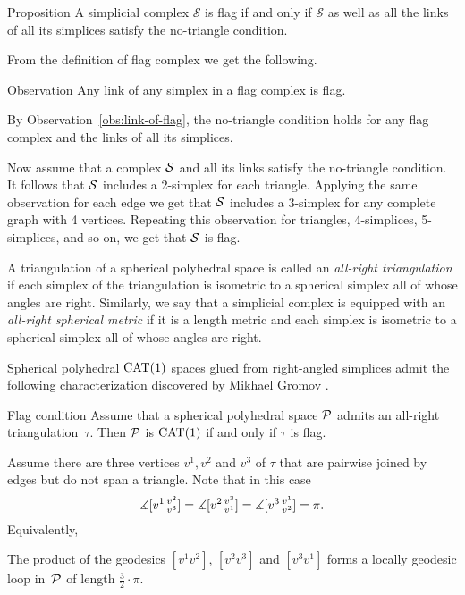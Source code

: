 \begin{thm}{Proposition}\label{prop:no-trig}
A simplicial complex $\mathcal{S}$ is flag if and only if 
$\mathcal{S}$ as well as all the links of all its simplices
satisfy the no-triangle condition.
\end{thm}

From the definition of flag complex 
we get the following.

\begin{thm}{Observation}\label{obs:link-of-flag}
Any link of any simplex in a flag complex is flag.
\end{thm}


By Observation~\ref{obs:link-of-flag}, the no-triangle condition holds 
for any flag complex and the  links of all its simplices.

Now assume that a complex $\mathcal{S}$ and all its links satisfy 
the no-triangle condition.
It follows that $\mathcal{S}$ includes a 2-simplex for each triangle.
Applying the same observation for each edge we get that $\mathcal{S}$ 
includes a 3-simplex for any complete graph with 4 vertices.
Repeating this observation 
for triangles, 
4-simplices,
5-simplices,
and so on, we get that $\mathcal{S}$ is flag.
\qeds


A triangulation of a spherical polyhedral space 
is called an  \emph{all-right triangulation} 
if each simplex of the triangulation is isometric 
to a spherical simplex all of whose angles are right.
Similarly, we say that a simplicial complex 
is equipped with an  \emph{all-right spherical metric}
if it is a length metric and each simplex is isometric 
to a spherical simplex all of whose angles are right.

Spherical polyhedral $\mathrm{CAT}(1)$ spaces glued from right-angled simplices
admit the following characterization 
discovered by Mikhael Gromov \cite[p.~122]{gromov-1987}.

\begin{thm}{Flag condition}\label{thm:flag}
Assume that a spherical polyhedral space $\mathcal{P}$
admits an all-right triangulation~$\tau$.
Then $\mathcal{P}$ is $\mathrm{CAT}(1)$
if and only if $\tau$ is flag.
\end{thm}

Assume there are three vertices $v^1,v^2$ and $v^3$ of $\tau$
that are pairwise joined by edges 
but do not span a triangle.
Note that in this case 
\[
\measuredangle[v^1\,{}^{v^2}_{v^3}]=
\measuredangle[v^2\,{}^{v^3}_{v^1}]=
\measuredangle[v^3\,{}^{v^1}_{v^2}]=
\pi.
\]
Equivalently,
\begin{clm}{}\label{clm:3pi/2}
The product
of the geodesics $[v^1v^2]$, $[v^2v^3]$ and $[v^3v^1]$
forms a locally geodesic loop in~$\mathcal{P}$ of length $\tfrac32\cdot\pi$.
\end{clm}

